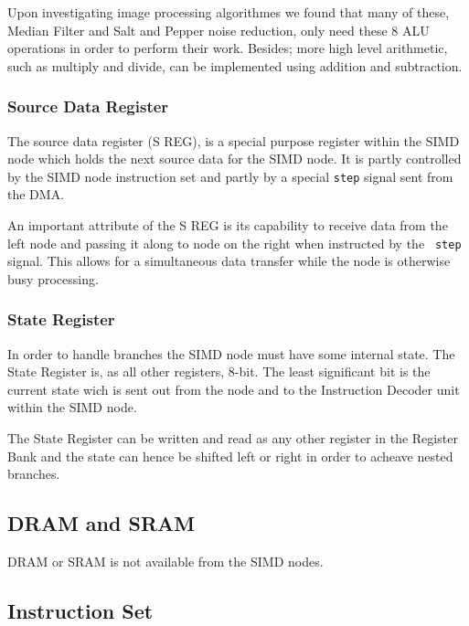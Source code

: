 
Upon investigating image processing algorithmes we found that many of these,
Median Filter and Salt and Pepper noise reduction, only need these 8 \ac{ALU}
operations in order to perform their work. Besides; more high level arithmetic,
such as multiply and divide, can be implemented using addition and subtraction.
\subsubsection{Source Data Register}
The source data register (S REG), is a special purpose register within the
\ac{SIMD} node which holds the next source data for the \ac{SIMD} node. It is
partly controlled by the \ac{SIMD} node instruction set and partly by a special
{\tt step} signal sent from the \ac{DMA}.

An important attribute of the S REG is its capability to receive data from the
left node and passing it along to node on the right when instructed by the {\tt
  step} signal. This allows for a simultaneous data transfer while the node is
otherwise busy processing.

\subsubsection{State Register}
In order to handle branches the \ac{SIMD} node must have some internal
state. The State Register is, as all other registers, 8-bit. The least
significant bit is the current state wich is sent out from the node and to the
Instruction Decoder unit within the \ac{SIMD} node.

The State Register can be written and read as any other register in the Register
Bank and the state can hence be shifted left or right in order to acheave nested
branches.

\subsection{DRAM and SRAM}


\ac{DRAM} or \ac{SRAM} is not available from the \ac{SIMD} nodes.

\subsection{Instruction Set}

